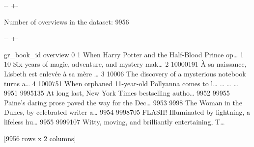\documentclass[letterpaper,10pt,english]{sphinxmanual}
\newlength\nbsphinxcodecellspacing
\begin{document}
{
\begin{sphinxVerbatim}[commandchars=\\\{\}]
\llap{\color{nbsphinxin}[15]:\,\hspace{\fboxrule}\hspace{\fboxsep}}\PYG{p}{[}\PYG{p}{]}
\end{sphinxVerbatim}
}

{

\kern-\sphinxverbatimsmallskipamount\kern-\baselineskip
\kern+\FrameHeightAdjust\kern-\fboxrule
\vspace{\nbsphinxcodecellspacing}

\begin{sphinxVerbatim}[commandchars=\\\{\}]
Number of overviews in the dataset: 9956
\end{sphinxVerbatim}
}

{

\kern-\sphinxverbatimsmallskipamount\kern-\baselineskip
\kern+\FrameHeightAdjust\kern-\fboxrule
\vspace{\nbsphinxcodecellspacing}

\begin{sphinxVerbatim}[commandchars=\\\{\}]
\llap{\color{nbsphinxout}[15]:\,\hspace{\fboxrule}\hspace{\fboxsep}}      gr\_book\_id                                           overview
0              1  When Harry Potter and the Half-Blood Prince op{\ldots}
1             10  Six years of magic, adventure, and mystery mak{\ldots}
2       10000191  À sa naissance, Lisbeth est enlevée à sa mère {\ldots}
3          10006  The discovery of a mysterious notebook turns a{\ldots}
4        1000751  When orphaned 11-year-old Pollyanna comes to l{\ldots}
{\ldots}          {\ldots}                                                {\ldots}
9951     9995135  At long last, New York Times bestselling autho{\ldots}
9952       99955  Paine's daring prose paved the way for the Dec{\ldots}
9953        9998  The Woman in the Dunes, by celebrated writer a{\ldots}
9954     9998705  FLASH! Illuminated by lightning, a lifeless hu{\ldots}
9955     9999107  Witty, moving, and brilliantly entertaining, T{\ldots}

[9956 rows x 2 columns]
\end{sphinxVerbatim}
}
\end{document}
